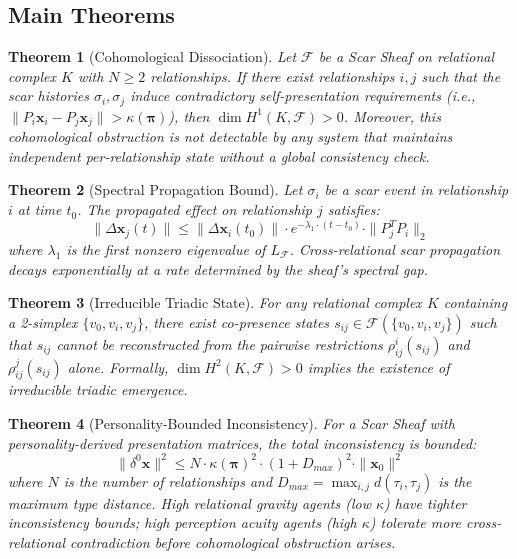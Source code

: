 \documentclass[11pt]{article}
\newtheorem{theorem}{Theorem}[section]
\begin{document}
\subsection{Main Theorems}

\begin{theorem}[Cohomological Dissociation]
\label{thm:sheaf-dissociation}
Let $\mathcal{F}$ be a Scar Sheaf on relational complex $K$ with $N \geq 2$ relationships. If there exist relationships $i, j$ such that the scar histories $\sigma_i, \sigma_j$ induce contradictory self-presentation requirements (i.e., $\|P_i \mathbf{x}_i - P_j \mathbf{x}_j\| > \kappa(\boldsymbol{\pi})$), then $\dim H^1(K, \mathcal{F}) > 0$. Moreover, this cohomological obstruction is not detectable by any system that maintains independent per-relationship state without a global consistency check.
\end{theorem}

\begin{theorem}[Spectral Propagation Bound]
\label{thm:sheaf-spectral}
Let $\sigma_i$ be a scar event in relationship $i$ at time $t_0$. The propagated effect on relationship $j$ satisfies:
\begin{equation}
\|\Delta \mathbf{x}_j(t)\| \leq \|\Delta \mathbf{x}_i(t_0)\| \cdot e^{-\lambda_1 \cdot (t - t_0)} \cdot \|P_j^T P_i\|_2
\end{equation}
where $\lambda_1$ is the first nonzero eigenvalue of $L_\mathcal{F}$. Cross-relational scar propagation decays exponentially at a rate determined by the sheaf's spectral gap.
\end{theorem}

\begin{theorem}[Irreducible Triadic State]
\label{thm:sheaf-triadic}
For any relational complex $K$ containing a 2-simplex $\{v_0, v_i, v_j\}$, there exist co-presence states $s_{ij} \in \mathcal{F}(\{v_0, v_i, v_j\})$ such that $s_{ij}$ cannot be reconstructed from the pairwise restrictions $\rho_{ij}^i(s_{ij})$ and $\rho_{ij}^j(s_{ij})$ alone. Formally, $\dim H^2(K, \mathcal{F}) > 0$ implies the existence of irreducible triadic emergence.
\end{theorem}

\begin{theorem}[Personality-Bounded Inconsistency]
\label{thm:sheaf-personality}
For a Scar Sheaf with personality-derived presentation matrices, the total inconsistency is bounded:
\begin{equation}
\|\delta^0 \mathbf{x}\|^2 \leq N \cdot \kappa(\boldsymbol{\pi})^2 \cdot (1 + D_{max})^2 \cdot \|\mathbf{x}_0\|^2
\end{equation}
where $N$ is the number of relationships and $D_{max} = \max_{i,j} d(\tau_i, \tau_j)$ is the maximum type distance. High relational gravity agents (low $\kappa$) have tighter inconsistency bounds; high perception acuity agents (high $\kappa$) tolerate more cross-relational contradiction before cohomological obstruction arises.
\end{theorem}
\end{document}
